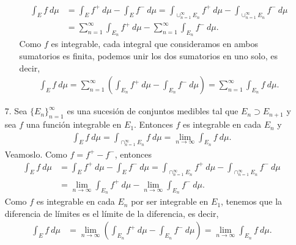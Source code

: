 \begin{obs}
\begin{enumerate}
\begin{enumerate}
\begin{align*}
                            \int_{E}{f \ d\mu} & = \int_{E}{f^+ \ d\mu} - \int_{E}{f^- \ d\mu} = \int_{\cup_{n=1}^{\infty}{E_n}}{f^+ \ d\mu} - \int_{\cup_{n=1}^{\infty}{E_n}}{f^- \ d\mu} \\
                                               & = \sum_{n=1}^{\infty}{\int_{E_n}{f^+ \ d\mu}} - \sum_{n=1}^{\infty}{\int_{E_n}{f^- \ d\mu}}.
                        \end{align*}
                        Como $f$ es integrable, cada integral que consideramos en ambos sumatorios es finita, podemos unir los dos sumatorios en uno solo, es decir,
                        \begin{align*}
                            \int_{E}{f \ d\mu} = \sum_{n=1}^{\infty}{\left(\int_{E_n}{f^+\ d\mu } - \int_{E_n}{f^- \ d\mu}\right)} = \sum_{n=1}^{\infty}{\int_{E_n}{f \ d\mu}}.
                        \end{align*}
              \end{enumerate}
        \item[7.] Sea $\{E_n\}_{n=1}^{\infty}$ es una sucesión de conjuntos medibles tal que $E_n \supset E_{n+1}$ y sea $f$ una función integrable en $E_1$. Entonces $f$ es integrable en cada $E_n$ y
              \begin{align*}
                  \int_{E}{f \ d\mu} = \int_{\cap_{n=1}^{\infty}{E_n}}{f \ d\mu} = \lim_{n \to \infty}{\int_{E_n}{f \ d\mu}}.
              \end{align*}
              Veamoslo. Como $f = f^+ - f^-$, entonces
              \begin{align*}
                  \int_{E}{f \ d\mu} & = \int_{E}{f^+ \ d\mu} - \int_{E}{f^- \ d\mu} = \int_{\cap_{n=1}^{\infty}{E_n}}{f^+ \ d\mu} - \int_{\cap_{n=1}^{\infty}{E_n}}{f^- \ d\mu} \\
                                     & = \lim_{n \to \infty}{\int_{E_n}{f^+ \ d\mu}} - \lim_{n \to \infty}{\int_{E_n}{f^- \ d\mu}}.
              \end{align*}
              Como $f$ es integrable en cada $E_n$ por ser integrable en $E_1$, tenemos que la diferencia de límites es el límite de la diferencia, es decir,
              \begin{align*}
                  \int_{E}{f \ d\mu} & = \lim_{n \to \infty}{\left( \int_{E_n}{f^+ \ d\mu} - \int_{E_n}{f^- \ d\mu}\right)} = \lim_{n \to \infty}{\int_{E_n}{f \ d\mu}}.
              \end{align*}
    \end{enumerate}
\end{obs}

